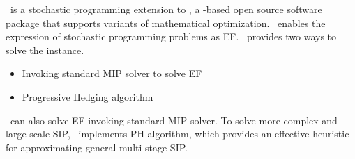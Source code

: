 \pysp\ is a stochastic programming extension to \pyomo, a \python-based open source software package that supports variants of mathematical optimization. \pysp\ enables the expression of stochastic programming problems as EF. \pysp\ provides two ways to solve the instance. 
\begin{itemize}
	\item Invoking standard MIP solver to solve EF
	\item Progressive Hedging algorithm
\end{itemize}
\pysp\ can also solve EF invoking standard MIP solver. To solve more complex and large-scale SIP, \pysp\ implements PH algorithm, which provides an effective heuristic for approximating general multi-stage SIP.



